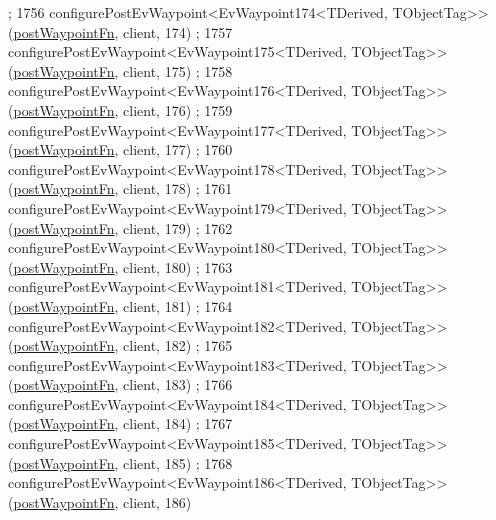 \begin{DoxyCode}
      ;
1756     configurePostEvWaypoint<EvWaypoint174<TDerived, TObjectTag>>(\hyperlink{classmove__base__z__client_1_1WaypointEventDispatcher_acc538eb7506c13f7cca2268a1742dadd}{postWaypointFn}, client, 174)
      ;
1757     configurePostEvWaypoint<EvWaypoint175<TDerived, TObjectTag>>(\hyperlink{classmove__base__z__client_1_1WaypointEventDispatcher_acc538eb7506c13f7cca2268a1742dadd}{postWaypointFn}, client, 175)
      ;
1758     configurePostEvWaypoint<EvWaypoint176<TDerived, TObjectTag>>(\hyperlink{classmove__base__z__client_1_1WaypointEventDispatcher_acc538eb7506c13f7cca2268a1742dadd}{postWaypointFn}, client, 176)
      ;
1759     configurePostEvWaypoint<EvWaypoint177<TDerived, TObjectTag>>(\hyperlink{classmove__base__z__client_1_1WaypointEventDispatcher_acc538eb7506c13f7cca2268a1742dadd}{postWaypointFn}, client, 177)
      ;
1760     configurePostEvWaypoint<EvWaypoint178<TDerived, TObjectTag>>(\hyperlink{classmove__base__z__client_1_1WaypointEventDispatcher_acc538eb7506c13f7cca2268a1742dadd}{postWaypointFn}, client, 178)
      ;
1761     configurePostEvWaypoint<EvWaypoint179<TDerived, TObjectTag>>(\hyperlink{classmove__base__z__client_1_1WaypointEventDispatcher_acc538eb7506c13f7cca2268a1742dadd}{postWaypointFn}, client, 179)
      ;
1762     configurePostEvWaypoint<EvWaypoint180<TDerived, TObjectTag>>(\hyperlink{classmove__base__z__client_1_1WaypointEventDispatcher_acc538eb7506c13f7cca2268a1742dadd}{postWaypointFn}, client, 180)
      ;
1763     configurePostEvWaypoint<EvWaypoint181<TDerived, TObjectTag>>(\hyperlink{classmove__base__z__client_1_1WaypointEventDispatcher_acc538eb7506c13f7cca2268a1742dadd}{postWaypointFn}, client, 181)
      ;
1764     configurePostEvWaypoint<EvWaypoint182<TDerived, TObjectTag>>(\hyperlink{classmove__base__z__client_1_1WaypointEventDispatcher_acc538eb7506c13f7cca2268a1742dadd}{postWaypointFn}, client, 182)
      ;
1765     configurePostEvWaypoint<EvWaypoint183<TDerived, TObjectTag>>(\hyperlink{classmove__base__z__client_1_1WaypointEventDispatcher_acc538eb7506c13f7cca2268a1742dadd}{postWaypointFn}, client, 183)
      ;
1766     configurePostEvWaypoint<EvWaypoint184<TDerived, TObjectTag>>(\hyperlink{classmove__base__z__client_1_1WaypointEventDispatcher_acc538eb7506c13f7cca2268a1742dadd}{postWaypointFn}, client, 184)
      ;
1767     configurePostEvWaypoint<EvWaypoint185<TDerived, TObjectTag>>(\hyperlink{classmove__base__z__client_1_1WaypointEventDispatcher_acc538eb7506c13f7cca2268a1742dadd}{postWaypointFn}, client, 185)
      ;
1768     configurePostEvWaypoint<EvWaypoint186<TDerived, TObjectTag>>(\hyperlink{classmove__base__z__client_1_1WaypointEventDispatcher_acc538eb7506c13f7cca2268a1742dadd}{postWaypointFn}, client, 186)

\end{DoxyCode}
